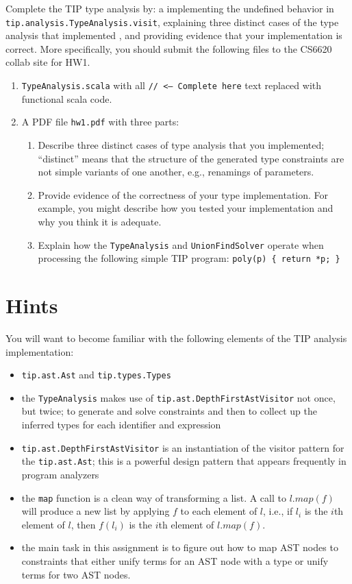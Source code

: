 \documentclass[12pt,letterpaper]{article}
\begin{document}
Complete the TIP type analysis by: a implementing the undefined behavior in\\
\texttt{tip.analysis.TypeAnalysis.visit}, explaining three distinct cases of the type analysis that implemented , and providing evidence that your implementation is correct.  More specifically, you should submit the following files to the CS6620 collab site for HW1.
\begin{enumerate}
\item \texttt{TypeAnalysis.scala} with all \texttt{// <--- Complete here} text replaced with functional scala code.
\item A PDF file \texttt{hw1.pdf} with three parts:
\begin{enumerate}
\item Describe three distinct cases of type analysis that you implemented; ``distinct'' means that the structure of the generated type constraints are not simple variants of one another, e.g., renamings of parameters. 
\item Provide evidence of the correctness of your type implementation.  For example, you might describe how you tested your implementation and why you think it is adequate.
\item Explain how the \texttt{TypeAnalysis} and \texttt{UnionFindSolver} operate
when processing the following simple TIP program: \texttt{poly(p) \{ return *p; \}}
\end{enumerate}
\end{enumerate}

\section*{Hints}
You will want to become familiar with the following elements of the TIP analysis implementation:
\begin{itemize}
\item \texttt{tip.ast.Ast} and \texttt{tip.types.Types}
\item the \texttt{TypeAnalysis} makes use of \texttt{tip.ast.DepthFirstAstVisitor} not once, but twice; to generate and solve constraints and then to collect up the inferred types for each identifier and expression
\item \texttt{tip.ast.DepthFirstAstVisitor} is an instantiation of the visitor pattern for the \texttt{tip.ast.Ast}; this is a powerful design pattern that appears frequently in program analyzers
\item the \texttt{map} function is a clean way of transforming a list.  A call to $l.map(f)$ will produce a new list by applying $f$ to each element of $l$, i.e., if $l_i$ is the $i$th element of $l$, then $f(l_i)$ is the $i$th element of $l.map(f)$.
\item the main task in this assignment is to figure out how to map AST nodes to constraints that either unify terms for an AST node with a type or unify terms for two AST nodes.
\end{itemize}
\end{document}
